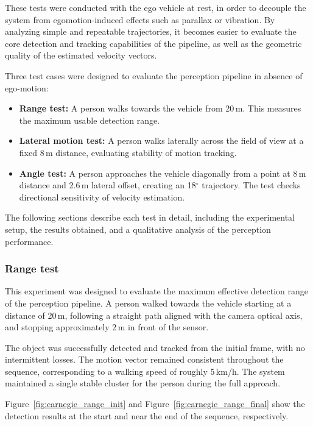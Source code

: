 These tests were conducted with the ego vehicle at rest, in order to 
decouple the system from egomotion-induced effects such as parallax 
or vibration. By analyzing simple and repeatable trajectories, it becomes 
easier to evaluate the core detection and tracking capabilities of the 
pipeline, as well as the geometric quality of the estimated velocity 
vectors.

Three test cases were designed to evaluate the perception pipeline in 
absence of ego-motion:

\begin{itemize}
  \item \textbf{Range test:} A person walks towards the vehicle from 
        20\,m. This measures the maximum usable detection range.
  \item \textbf{Lateral motion test:} A person walks laterally across 
        the field of view at a fixed 8\,m distance, evaluating stability 
        of motion tracking.
  \item \textbf{Angle test:} A person approaches the vehicle 
        diagonally from a point at 8\,m distance and 2.6\,m lateral 
        offset, creating an 18$^\circ$ trajectory. The test checks 
        directional sensitivity of velocity estimation.
\end{itemize}

The following sections describe each test in detail, including the
experimental setup, the results obtained, and a qualitative analysis of
the perception performance. 

\subsubsection{Range test}  

This experiment was designed to evaluate the maximum effective detection 
range of the perception pipeline. A person walked towards the vehicle 
starting at a distance of 20\,m, following a straight path aligned with the 
camera optical axis, and stopping approximately 2\,m in front of the sensor.

The object was successfully detected and tracked from the initial frame, 
with no intermittent losses. The motion vector remained consistent 
throughout the sequence, corresponding to a walking speed of roughly 
5\,km/h. The system maintained a single stable cluster for the person 
during the full approach.

Figure~\ref{fig:carnegie_range_init} and 
Figure~\ref{fig:carnegie_range_final} show the detection results at the 
start and near the end of the sequence, respectively.

